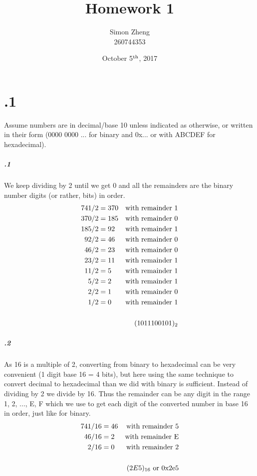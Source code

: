 \documentclass[11pt,letterpaper]{article}
\author{Simon Zheng\\260744353}
\title{Homework 1}
\date{October 5$^{\textnormal{th}}$, 2017}
\begin{document}
	\maketitle
	\thispagestyle{fancy}
	
	\section{.1}
	Assume numbers are in decimal/base 10 unless indicated as otherwise, or written in their form (0000 0000 ... for binary and 0x... or with ABCDEF for hexadecimal).
	
		\subparagraph{.1}
		We keep dividing by 2 until we get 0 and all the remainders are the binary number digits (or rather, bits) in order.
		\begin{align*}
		741 / 2 &= 370&\textnormal{with remainder 1}\\
		370 / 2 &= 185&\textnormal{with remainder 0}\\
		185 / 2 &=  92&\textnormal{with remainder 1}\\
		 92 / 2 &=  46&\textnormal{with remainder 0}\\
		 46 / 2 &=  23&\textnormal{with remainder 0}\\
		 23 / 2 &=  11&\textnormal{with remainder 1}\\
		 11 / 2 &=   5&\textnormal{with remainder 1}\\
		  5 / 2 &=   2&\textnormal{with remainder 1}\\
		  2 / 2 &=   1&\textnormal{with remainder 0}\\
		  1 / 2 &=   0&\textnormal{with remainder 1}\\
		\\
		&&(10 1110 0101)_2
		\end{align*}
		
		\subparagraph{.2}
		As 16 is a multiple of 2, converting from binary to hexadecimal can be very convenient (1 digit base 16 = 4 bits), but here using the same technique to convert decimal to hexadecimal than we did with binary is sufficient. Instead of dividing by 2 we divide by 16. Thus the remainder can be any digit in the range 1, 2, ..., E, F which we use to get each digit of the converted number in base 16 in order, just like for binary.
		\begin{align*}
		741 / 16 &= 46&\textnormal{with remainder 5}\\
		 46 / 16 &=  2&\textnormal{with remainder E}\\
		  2 / 16 &=  0&\textnormal{with remainder 2}\\
		\\
		&&(2E5)_{16}\textnormal{ or 0x2e5}
		\end{align*}
		
\end{document}
